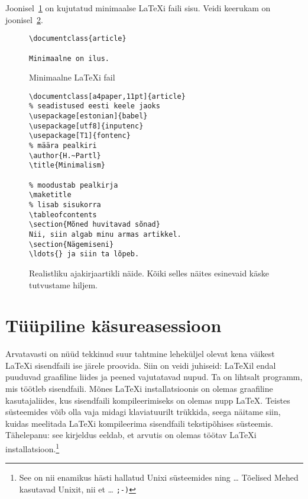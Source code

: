 {Joonisel~\ref{mini} on kujutatud minimaalse \LaTeX i faili sisu. Veidi
keerukam  on joonisel~\ref{document}.

\begin{figure}[tp]
\begin{lined}{6cm}
\begin{verbatim}
\documentclass{article}

Minimaalne on ilus.

\end{verbatim}
\end{lined}
\caption{Minimaalne \LaTeX i fail} \label{mini}
\end{figure}

\begin{figure}[tp]
\begin{lined}{10cm}
\begin{verbatim}
\documentclass[a4paper,11pt]{article}
% seadistused eesti keele jaoks
\usepackage[estonian]{babel}
\usepackage[utf8]{inputenc}
\usepackage[T1]{fontenc}
% määra pealkiri
\author{H.~Partl}
\title{Minimalism}

% moodustab pealkirja
\maketitle
% lisab sisukorra
\tableofcontents
\section{Mõned huvitavad sõnad}
Nii, siin algab minu armas artikkel.
\section{Nägemiseni}
\ldots{} ja siin ta lõpeb.

\end{verbatim}
\end{lined}
\caption[Realistliku ajakirjaartikli näide]{Realistliku ajakirjaartikli
näide. Kõiki selles näites esinevaid käske tutvustame hiljem.}
\label{document}

\end{figure}

\section{Tüüpiline käsureasessioon}

Arvatavasti on nüüd tekkinud suur tahtmine leheküljel \pageref{mini}
olevat kena väikest \LaTeX i sisendfaili ise järele proovida. Siin on
veidi juhiseid: \LaTeX il endal puuduvad graafiline liides ja peened
vajutatavad nupud. Ta on lihtsalt programm, mis töötleb sisendfaili.
Mõnes \LaTeX i installatsioonis on olemas graafiline kasutajaliides, kus
sisendfaili kompileerimiseks on olemas nupp \LaTeX. Teistes süsteemides
võib olla vaja midagi klaviatuurilt trükkida, seega näitame siin, kuidas
meelitada \LaTeX i kompileerima sisendfaili tekstipõhises süsteemis.
Tähelepanu: see kirjeldus eeldab, et arvutis on olemas töötav \LaTeX i
installatsioon.\footnote{See on nii enamikus hästi hallatud Unixi
süsteemides ning \ldots{} Tõelised Mehed kasutavad Unixit, nii et
\ldots{} \texttt{;-)}}

}
